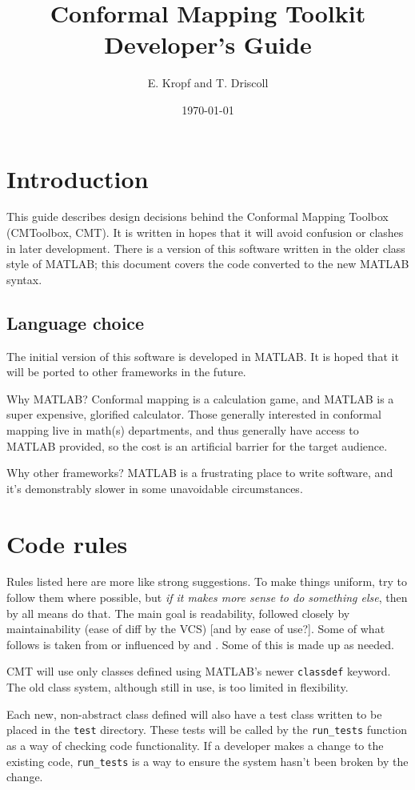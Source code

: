 \documentclass[12pt]{article}
\title{Conformal Mapping Toolkit Developer's Guide}
\author{E. Kropf and T. Driscoll}
\date{\today}
\begin{document}
\maketitle
\tableofcontents
\clearpage

\section{Introduction}
This guide describes design decisions behind the Conformal Mapping Toolbox (CMToolbox, CMT). It is written in hopes that it will avoid confusion or clashes in later development. There is a version of this software written in the older class style of MATLAB; this document covers the code converted to the new MATLAB syntax.

\subsection{Language choice}
The initial version of this software is developed in MATLAB. It is hoped that it will be ported to other frameworks in the future.

Why MATLAB? Conformal mapping is a calculation game, and MATLAB is a super expensive, glorified calculator. Those generally interested in conformal mapping live in math(s) departments, and thus generally have access to MATLAB provided, so the cost is an artificial barrier for the target audience.

Why other frameworks? MATLAB is a frustrating place to write software, and it's demonstrably slower in some unavoidable circumstances.

\section{Code rules}
Rules listed here are more like strong suggestions. To make things uniform, try to follow them where possible, but \emph{if it makes more sense to do something else}, then by all means do that. The main goal is readability, followed closely by maintainability (ease of diff by the VCS) [and by ease of use?]. Some of what follows is taken from or influenced by \cite{chebfunCodingStyle} and \cite{pythonStyleGuide}. Some of this is made up as needed.

CMT will use only classes defined using MATLAB's newer \verb+classdef+ keyword. The old class system, although still in use, is too limited in flexibility.

Each new, non-abstract class defined will also have a test class written to be placed in the \verb+test+ directory. These tests will be called by the \verb+run_tests+ function as a way of checking code functionality. If a developer makes a change to the existing code, \verb+run_tests+ is a way to ensure the system hasn't been broken by the change.
\end{document}
